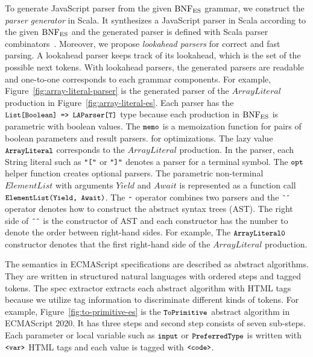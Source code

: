 To generate JavaScript parser from the given \( \text{BNF}_{\text{ES}} \) grammar,
we construct the \textit{parser generator} in Scala.
It synthesizes a JavaScript parser in Scala according to the given \( \text{BNF}_{\text{ES}} \)
and the generated parser is defined with Scala parser combinators~\cite{scala-parser-combinators}.
Moreover, we propose \textit{lookahead parsers} for correct and fast parsing.
A lookahead parser keeps track of its lookahead, which is the set of
the possible next tokens. With lookahead parsers, the generated parsers are
readable and one-to-one corresponds to each grammar components.
For example, Figure~\ref{fig:array-literal-parser} is the generated parser of
the \( ArrayLiteral \) production in Figure~\ref{fig:array-literal-es}.
Each parser has the \( \texttt{\small List[Boolean] => LAParser[T]} \) type because
each production in \( \text{BNF}_{\text{ES}} \) is parametric with boolean values.
The \( \texttt{\small memo} \) is a memoization function for pairs of boolean parameters and result parsers.
for optimizations. The lazy value \( \texttt{\small ArrayLiteral} \) corresponds to the \( ArrayLiteral \)
production. In the parser, each String literal such as \( \texttt{\small"["} \) or \( \texttt{\small"]"} \)
denotes a parser for a terminal symbol. The \( \texttt{\small opt} \) helper function creates
optional parsers. The parametric non-terminal \( ElementList \) with arguments \( Yield \)
and \( Await \) is represented as a function call \( \texttt{\small ElementList(Yield, Await)} \).
The \( \texttt{\small\textasciitilde} \) operator combines two parsers
and the \( \texttt{\small\^{}\^{}} \) operator denotes how to construct the abstract syntax trees (AST).
The right side of \( \texttt{\small\^{}\^{}} \) is the constructor of AST and each constructor
has the number to denote the order between right-hand sides. For example,
The \( \texttt{\small ArrayLiteral0} \) constructor denotes that the first right-hand side of
the \( ArrayLiteral \) production.

The semantics in ECMAScript specifications are described as
abstract algorithms. They are written in structured natural languages
with ordered steps and tagged tokens. The spec extractor extracts each abstract algorithm
with HTML tags because we utilize tag information to discriminate different kinds of tokens.
For example, Figure~\ref{fig:to-primitive-es} is the \( \texttt{\small ToPrimitive} \)
abstract algorithm in ECMAScript 2020. It has three steps and
second step consists of seven sub-steps. Each parameter or local variable such as
\( \texttt{\small input} \) or \( \texttt{\small PreferredType} \) is written with \( \texttt{\small<var>} \) HTML tags
and each value is tagged with \( \texttt{\small<code>} \).


